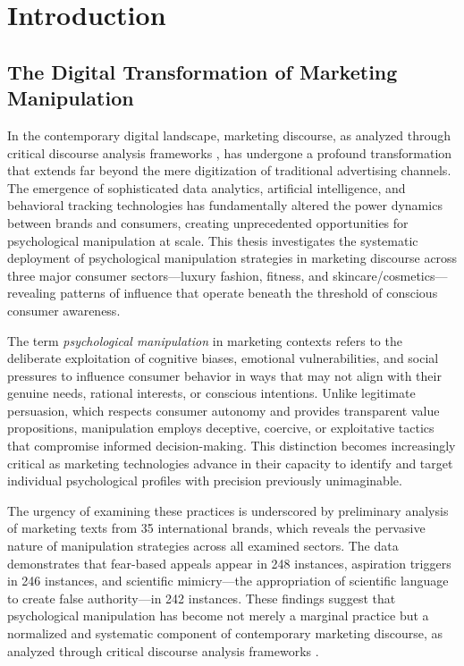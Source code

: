 
\chapter{Introduction}
\label{ch:introduction}

\section{The Digital Transformation of Marketing Manipulation}
\label{sec:digital_transformation}

In the contemporary digital landscape, marketing discourse, as analyzed through critical discourse analysis frameworks \cite{fairclough2015language}, has undergone a profound transformation that extends far beyond the mere digitization of traditional advertising channels. The emergence of sophisticated data analytics, artificial intelligence, and behavioral tracking technologies has fundamentally altered the power dynamics between brands and consumers, creating unprecedented opportunities for psychological manipulation at scale. This thesis investigates the systematic deployment of psychological manipulation strategies in marketing discourse across three major consumer sectors—luxury fashion, fitness, and skincare/cosmetics—revealing patterns of influence that operate beneath the threshold of conscious consumer awareness.

The term \emph{psychological manipulation} in marketing contexts refers to the deliberate exploitation of cognitive biases, emotional vulnerabilities, and social pressures to influence consumer behavior in ways that may not align with their genuine needs, rational interests, or conscious intentions. Unlike legitimate persuasion, which respects consumer autonomy and provides transparent value propositions, manipulation employs deceptive, coercive, or exploitative tactics that compromise informed decision-making. This distinction becomes increasingly critical as marketing technologies advance in their capacity to identify and target individual psychological profiles with precision previously unimaginable.

The urgency of examining these practices is underscored by preliminary analysis of marketing texts from 35 international brands, which reveals the pervasive nature of manipulation strategies across all examined sectors. The data demonstrates that fear-based appeals appear in 248 instances, aspiration triggers in 246 instances, and scientific mimicry—the appropriation of scientific language to create false authority—in 242 instances. These findings suggest that psychological manipulation has become not merely a marginal practice but a normalized and systematic component of contemporary marketing discourse, as analyzed through critical discourse analysis frameworks \cite{fairclough2015language}.

